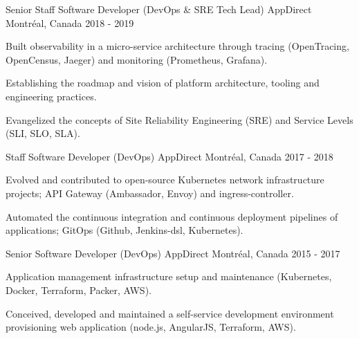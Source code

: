 \begin{cventries}
  \cventry
    {Senior Staff Software Developer (DevOps \& SRE Tech Lead)} %
    {AppDirect} %
    {Montréal, Canada} %
    {2018 - 2019} %
    {
      \begin{cvitems} %
        \item {Built observability in a micro-service architecture through tracing (OpenTracing, OpenCensus, Jaeger) and monitoring (Prometheus, Grafana).}
        \item {Establishing the roadmap and vision of platform architecture, tooling and engineering practices.}
        \item {Evangelized the concepts of Site Reliability Engineering (SRE) and Service Levels (SLI, SLO, SLA).}
      \end{cvitems}
    }

  \cventry
    {Staff Software Developer (DevOps)} %
    {AppDirect} %
    {Montréal, Canada} %
    {2017 - 2018} %
    {
      \begin{cvitems} %
        \item {Evolved and contributed to open-source Kubernetes network infrastructure projects; API Gateway (Ambassador, Envoy) and ingress-controller.}
        \item {Automated the continuous integration and continuous deployment pipelines of applications; GitOps (Github, Jenkins-dsl, Kubernetes).}
      \end{cvitems}
    }

  \cventry
    {Senior Software Developer (DevOps)} %
    {AppDirect} %
    {Montréal, Canada} %
    {2015 - 2017} %
    {
      \begin{cvitems} %
        \item {Application management infrastructure setup and maintenance (Kubernetes, Docker, Terraform, Packer, AWS).}
        \item {Conceived, developed and maintained a self-service development environment provisioning web application (node.js, AngularJS, Terraform, AWS).}
      \end{cvitems}
    }


\end{cventries}
